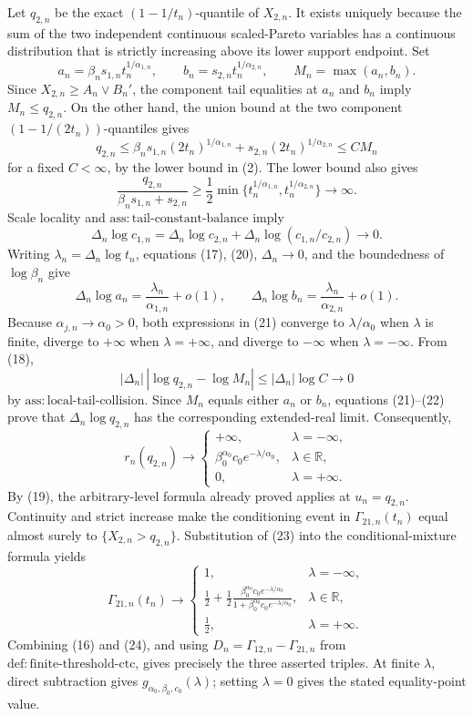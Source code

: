 Let \(q_{2,n}\) be the exact \((1-1/t_n)\)-quantile of \(X_{2,n}\). It exists uniquely because the sum of the two independent continuous scaled-Pareto variables has a continuous distribution that is strictly increasing above its lower support endpoint. Set
\[
a_n=\beta_ns_{1,n}t_n^{1/\alpha_{1,n}},
\qquad b_n=s_{2,n}t_n^{1/\alpha_{2,n}},
\qquad M_n=\max(a_n,b_n).
\tag{17}
\]
Since \(X_{2,n}\geq A_n\vee B_n'\), the component tail equalities at \(a_n\) and \(b_n\) imply \(M_n\leq q_{2,n}\). On the other hand, the union bound at the two component \((1-1/(2t_n))\)-quantiles gives
\[
q_{2,n}
\leq\beta_ns_{1,n}(2t_n)^{1/\alpha_{1,n}}
+s_{2,n}(2t_n)^{1/\alpha_{2,n}}
\leq C M_n
\tag{18}
\]
for a fixed \(C<\infty\), by the lower bound in (2). The lower bound also gives
\[
\frac{q_{2,n}}{\beta_ns_{1,n}+s_{2,n}}
\geq\frac12\min\{t_n^{1/\alpha_{1,n}},t_n^{1/\alpha_{2,n}}\}
\to\infty.
\tag{19}
\]
Scale locality and \(\mathrm{ass{:}tail\text{-}constant\text{-}balance}\) imply
\[
\Delta_n\log c_{1,n}
=\Delta_n\log c_{2,n}+\Delta_n\log(c_{1,n}/c_{2,n})\to0.
\tag{20}
\]
Writing \(\lambda_n=\Delta_n\log t_n\), equations (17), (20), \(\Delta_n\to0\), and the boundedness of \(\log\beta_n\) give
\[
\Delta_n\log a_n=\frac{\lambda_n}{\alpha_{1,n}}+o(1),
\qquad
\Delta_n\log b_n=\frac{\lambda_n}{\alpha_{2,n}}+o(1).
\tag{21}
\]
Because \(\alpha_{j,n}\to\alpha_0>0\), both expressions in (21) converge to \(\lambda/\alpha_0\) when \(\lambda\) is finite, diverge to \(+\infty\) when \(\lambda=+\infty\), and diverge to \(-\infty\) when \(\lambda=-\infty\). From (18),
\[
|\Delta_n|\,|\log q_{2,n}-\log M_n|
\leq|\Delta_n|\log C\to0
\tag{22}
\]
by \(\mathrm{ass{:}local\text{-}tail\text{-}collision}\). Since \(M_n\) equals either \(a_n\) or \(b_n\), equations (21)--(22) prove that \(\Delta_n\log q_{2,n}\) has the corresponding extended-real limit. Consequently,
\[
r_n(q_{2,n})\longrightarrow
\begin{cases}
+\infty, & \lambda=-\infty,\\
\beta_0^{\alpha_0}c_0e^{-\lambda/\alpha_0}, & \lambda\in\mathbb R,\\
0, & \lambda=+\infty.
\end{cases}
\tag{23}
\]
By (19), the arbitrary-level formula already proved applies at \(u_n=q_{2,n}\). Continuity and strict increase make the conditioning event in \(\Gamma_{21,n}(t_n)\) equal almost surely to \(\{X_{2,n}>q_{2,n}\}\). Substitution of (23) into the conditional-mixture formula yields
\[
\Gamma_{21,n}(t_n)\longrightarrow
\begin{cases}
1, & \lambda=-\infty,\\
\displaystyle\frac12+\frac12\frac{\beta_0^{\alpha_0}c_0e^{-\lambda/\alpha_0}}{1+\beta_0^{\alpha_0}c_0e^{-\lambda/\alpha_0}}, & \lambda\in\mathbb R,\\
\frac12, & \lambda=+\infty.
\end{cases}
\tag{24}
\]
Combining (16) and (24), and using \(D_n=\Gamma_{12,n}-\Gamma_{21,n}\) from \(\mathrm{def{:}finite\text{-}threshold\text{-}ctc}\), gives precisely the three asserted triples. At finite \(\lambda\), direct subtraction gives \(g_{\alpha_0,\beta_0,c_0}(\lambda)\); setting \(\lambda=0\) gives the stated equality-point value.
